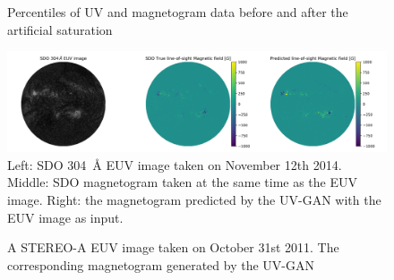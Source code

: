 \documentclass[11pt,a4paper,onecolumn]{report}
\begin{document}
\begin{figure}
  \centering
  
  \caption{Percentiles of UV and magnetogram data before and after the artificial saturation}
  \label{fig:artificial_sat}
\end{figure}



\begin{figure}[t]%
  \includegraphics[width=\linewidth]{aia_hmi_mag.png}
  \caption[]{Left: SDO \SI{304}{\angstrom} EUV image taken on November 12th
  2014. Middle: SDO magnetogram taken at the same time as the EUV image. Right:
  the magnetogram predicted by the UV-GAN with the EUV image as input.}
  \label{fig:aia_hmi_mag}
\end{figure}

\begin{figure}[t]
  \centering
 \caption{ A STEREO-A EUV image taken on October 31st
  2011.  The corresponding magnetogram generated by the
  UV-GAN}
  \label{fig:stereo_mag}
\end{figure}
\end{document}
